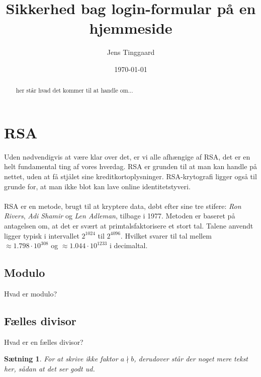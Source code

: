 \documentclass[a4paper, 12pt]{article}
\date{\today}
\title{Sikkerhed bag login-formular på en hjemmeside}
\author{Jens Tinggaard}
\theoremstyle{break}
\theoremstyle{breakline}
\newtheorem{sentence}[definition]{Sætning} %
\newenvironment{sent}
    {\begin{sentence}}
    {\par\noindent\hrulefill\end{sentence}}
\theoremstyle{beviser}
\begin{document}
\clearpage\maketitle
\thispagestyle{empty}
\maketitle

\begin{abstract}
her står hvad det kommer til at handle om...
\end{abstract}



\newpage
\tableofcontents


\newpage
\section{RSA}
Uden nødvendigvis at være klar over det, er vi alle afhængige af RSA, det er en helt fundamental ting af vores hverdag.
RSA er grunden til at man kan handle på nettet, uden at få stjålet sine kreditkortoplysninger.
RSA-krytografi ligger også til grunde for, at man ikke blot kan lave online identitetstyveri.\cite{vestergaard}
\\
\\
RSA er en metode, brugt til at kryptere data, døbt efter sine tre stifere:
\textit{Ron Rivers}, \textit{Adi Shamir} og \textit{Len Adleman}, tilbage i 1977.\cite{vestergaard}
Metoden er baseret på antagelsen om, at det er svært at primtalsfaktorisere et stort tal.
Talene anvendt ligger typisk i intervallet \(2^{1024}\) til \(2^{4096}\).
Hvilket svarer til tal mellem \(\approx1.798\cdot10^{308}\) og \(\approx1.044\cdot10^{1233}\) i decimaltal.\cite{frividen} %

    \subsection{Modulo}
    Hvad er modulo?

    \subsection{Fælles divisor}
    Hvad er en fælles divisor?


    \begin{sent}
        For at skrive ikke faktor \(a \nmid b\), derudover står der noget mere tekst her, sådan at det ser godt ud.
    \end{sent}
\end{document}
